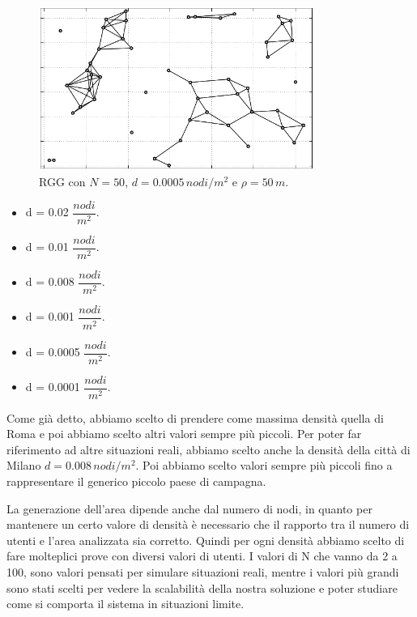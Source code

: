 \begin{figure}[t]
	\centering
	\includegraphics[width=0.8\textwidth, keepaspectratio]{Images/reti/RandomGeometricGraph_15}
	\caption[RGG con configurazione]{RGG con $ N=50 $, $ d=0.0005 \, nodi/m^2$ e $ \rho=50\,m$.}
	\label{fig:rgg_gen_02}
\end{figure}

\begin{itemize}
	\item d = 0.02 $ \dfrac{nodi}{m^{2}} $.
	\item d = 0.01 $ \dfrac{nodi}{m^{2}} $.
	\item d = 0.008 $ \dfrac{nodi}{m^{2}} $.
	\item d = 0.001 $ \dfrac{nodi}{m^{2}} $.
	\item d = 0.0005 $ \dfrac{nodi}{m^{2}} $.
	\item d = 0.0001 $ \dfrac{nodi}{m^{2}} $.
\end{itemize}
Come già detto, abbiamo scelto di prendere come massima densità quella di Roma e poi abbiamo scelto altri valori sempre più piccoli. Per poter far riferimento ad altre situazioni reali, abbiamo scelto anche la densità della città di Milano $ d=0.008\,nodi/m^2 $. Poi abbiamo scelto valori sempre più piccoli fino a rappresentare il generico piccolo paese di campagna.

La generazione dell'area dipende anche dal numero di nodi, in quanto per mantenere un certo valore di densità è necessario che il rapporto tra il numero di utenti e l'area analizzata sia corretto. Quindi per ogni densità abbiamo scelto di fare molteplici prove con diversi valori di utenti. I valori di N che vanno da 2 a 100, sono valori pensati per simulare situazioni reali, mentre i valori più grandi sono stati scelti per vedere la scalabilità della nostra soluzione e poter studiare come si comporta il sistema in situazioni limite.
\medskip


